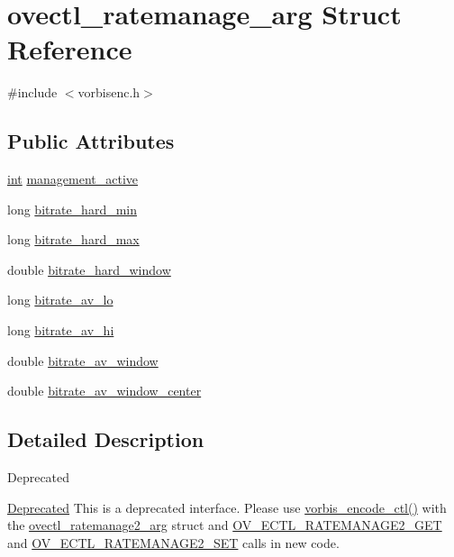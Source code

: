 \hypertarget{structovectl__ratemanage__arg}{}\section{ovectl\+\_\+ratemanage\+\_\+arg Struct Reference}
\label{structovectl__ratemanage__arg}


{\ttfamily \#include $<$vorbisenc.\+h$>$}

\subsection*{Public Attributes}
\begin{DoxyCompactItemize}
\item 
\hyperlink{xmltok_8h_a5a0d4a5641ce434f1d23533f2b2e6653}{int} \hyperlink{structovectl__ratemanage__arg_ad792d1b89a5d07f0f0e90509df4bc606}{management\+\_\+active}
\item 
long \hyperlink{structovectl__ratemanage__arg_a449d3ea8d0645742af859dd17b41fbfb}{bitrate\+\_\+hard\+\_\+min}
\item 
long \hyperlink{structovectl__ratemanage__arg_a3620024b5a9e4b4df6d20deb6c125c92}{bitrate\+\_\+hard\+\_\+max}
\item 
double \hyperlink{structovectl__ratemanage__arg_a68caf36fc02a52199705fa331d118446}{bitrate\+\_\+hard\+\_\+window}
\item 
long \hyperlink{structovectl__ratemanage__arg_ac241670a3a608f114acaf8f26fe4e913}{bitrate\+\_\+av\+\_\+lo}
\item 
long \hyperlink{structovectl__ratemanage__arg_ac1e81b5a2e705022ca895f494718ded7}{bitrate\+\_\+av\+\_\+hi}
\item 
double \hyperlink{structovectl__ratemanage__arg_a1232e7296ae5e52f52039bed2560c505}{bitrate\+\_\+av\+\_\+window}
\item 
double \hyperlink{structovectl__ratemanage__arg_aad317d50fb4d072e2c55f0a60d1a83b2}{bitrate\+\_\+av\+\_\+window\+\_\+center}
\end{DoxyCompactItemize}


\subsection{Detailed Description}
\begin{DoxyRefDesc}{Deprecated}
\item[\hyperlink{deprecated__deprecated000031}{Deprecated}]This is a deprecated interface. Please use \hyperlink{vorbisenc_8h_a5f398a378e20b8ce5e3341a582e773bd}{vorbis\+\_\+encode\+\_\+ctl()} with the \hyperlink{structovectl__ratemanage2__arg}{ovectl\+\_\+ratemanage2\+\_\+arg} struct and \hyperlink{vorbisenc_8h_af95048070bedb467f80ce85e20057126}{O\+V\+\_\+\+E\+C\+T\+L\+\_\+\+R\+A\+T\+E\+M\+A\+N\+A\+G\+E2\+\_\+\+G\+ET} and \hyperlink{vorbisenc_8h_a5075e0acb85fd45398a290594f83d6ba}{O\+V\+\_\+\+E\+C\+T\+L\+\_\+\+R\+A\+T\+E\+M\+A\+N\+A\+G\+E2\+\_\+\+S\+ET} calls in new code.\end{DoxyRefDesc}


